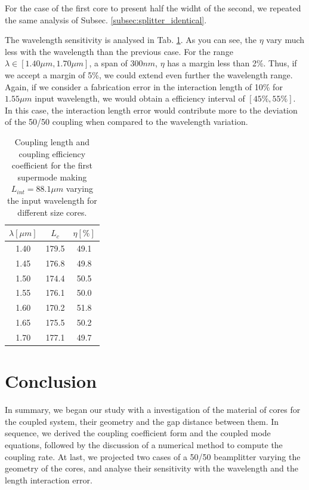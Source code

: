 \documentclass[conference, a4paper]{IEEEtran}
\begin{document}
For the case of the first core to present half the widht of the second, we repeated the same analysis of Subsec. \ref{subsec:splitter_identical}. 


The wavelength sensitivity is analysed in Tab. \ref{tab:splitter_doubled_lc}. As you can see, the $\eta$ vary much less with the wavelength than the previous case. For the range $\lambda \in [1.40 \mu m, 1.70 \mu m]$, a span of $300nm$, $\eta$ has a margin less than 2\%. Thus, if we accept a margin of 5\%, we could extend even further the wavelength range. Again, if we consider a fabrication error in the interaction length of 10\% for $1.55\mu m$ input wavelength, we would obtain a efficiency interval of $[45\%, 55\%]$. In this case, the interaction length error would contribute more to the deviation of the 50/50 coupling when compared to the wavelength variation.

\begin{table}[H]
    \centering
    \begin{tabular}{ccc}
        \toprule
        $\lambda [\mu m]$ & $L_c$ & $\eta[\%]$ \\
        \midrule
        1.40 & 179.5 & 49.1 \\
        1.45 & 176.8 & 49.8 \\
        1.50 & 174.4 & 50.5 \\
        1.55 & 176.1 & 50.0 \\
        1.60 & 170.2 & 51.8 \\
        1.65 & 175.5 & 50.2 \\
        1.70 & 177.1 & 49.7 \\    
        \bottomrule
    \end{tabular}
    \caption{Coupling length and coupling efficiency coefficient for the first supermode making $L_{int} = 88.1\mu m$ varying the input wavelength for different size cores.}
    \label{tab:splitter_doubled_lc}
\end{table}

\section{Conclusion}
\label{sec:conclusion}

In summary, we began our study with a investigation of the material of cores for the coupled system, their geometry and the gap distance between them. In sequence, we derived the coupling coefficient form and the coupled mode equations, followed by the discussion of a numerical method to compute the coupling rate. At last, we projected two cases of a 50/50 beamplitter varying the geometry of the cores, and analyse their sensitivity with the wavelength and the length interaction error.

% 
% 
\end{document}
